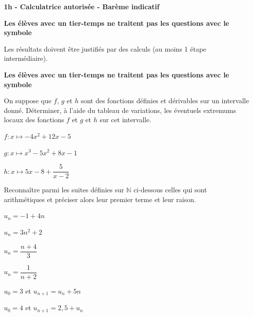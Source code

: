 \documentclass[12pt,a4paper]{article}  %
\begin{document}
\graphicspath{{images/}}

\begin{center}

\end{center}


\begin{center}\textbf{1h - Calculatrice autorisée - Barème indicatif}\end{center}

\begin{center}\textbf{Les élèves avec un tier-temps ne traitent pas les questions avec  le symbole }\end{center}

\begin{center}
Les résultats doivent être justifiés par des calculs (au moins 1 étape intermédiaire).
\end{center}

\begin{center}\textbf{Les élèves avec un tier-temps ne traitent pas les questions avec  le symbole }\end{center}

On suppose que $f$, $g$ et $h$ sont des fonctions définies et dérivables sur un intervalle donné. Déterminer, à l'aide du tableau de variations, les éventuels extremums locaux des fonctions $f$ et $g$ et $h$ sur cet intervalle.
\begin{enumMet}
    \item $f: x \mapsto -4x^{2}+12 x-5$
    \item $g: x \mapsto x^{3}-5 x^{2}+8 x-1$
    \item {} $h: x \mapsto 5x-8+\dfrac{5}{x-2}$
\end{enumMet}


Reconnaître parmi les suites définies sur $\mathbb{N}$ ci-dessous celles qui sont arithmétiques et préciser alors leur premier terme et leur raison.
\begin{enumMet}
    \item $u_{n}=-1+4 n$
    \item $u_{n}=3 n^{2}+2$
    \item $u_{n}=\dfrac{n+4}{3}$
    \item $u_{n}=\dfrac{1}{n+2}$
    \item $u_{0}=3$ et $u_{n+1}=u_{n}+5 n$
    \item $u_{0}=4$ et $u_{n+1}=2,5+u_{n}$
\end{enumMet}
\end{document}
